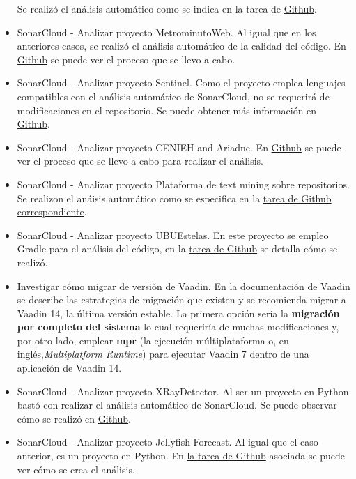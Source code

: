 \begin{itemize}
		Se realizó el análisis automático como se indica en la tarea de \href{https://github.com/dbo1001/Gestor-TFG-2021/issues/80}{Github}.
	\item SonarCloud - Analizar proyecto MetrominutoWeb. 
		Al igual que en los anteriores casos, se realizó el análisis automático de la calidad del código. En \href{https://github.com/dbo1001/Gestor-TFG-2021/issues/81}{Github} se puede ver el proceso que se llevo a cabo.
	\item SonarCloud - Analizar proyecto Sentinel. 
		Como el proyecto emplea lenguajes compatibles con el análisis automático de SonarCloud, no se requerirá de modificaciones en el repositorio. Se puede obtener más información en \href{https://github.com/dbo1001/Gestor-TFG-2021/issues/82}{Github}.
	\item SonarCloud - Analizar proyecto CENIEH and Ariadne. 
		En \href{https://github.com/dbo1001/Gestor-TFG-2021/issues/84}{Github} se puede ver el proceso que se llevo a cabo para realizar el análisis.
	\item SonarCloud - Analizar proyecto Plataforma de text mining sobre repositorios. 
		Se realizon el anáisis automático como se especifica en la \href{https://github.com/dbo1001/Gestor-TFG-2021/issues/83}{tarea de Github correspondiente}.
	\item SonarCloud - Analizar proyecto UBUEstelas. 	
		En este proyecto se empleo Gradle para el análisis del código, en la \href{https://github.com/dbo1001/Gestor-TFG-2021/issues/77}{tarea de Github} se detalla cómo se realizó.
	\item Investigar cómo migrar de versión de Vaadin.  
		En la \href{https://vaadin.com/docs/v14/guide/upgrading/v8}{documentación de Vaadin} se describe las estrategias de migración que existen y se recomienda migrar a Vaadin 14, la última versión estable. 
		La primera opción sería la \textbf{migración por completo del sistema} lo cual requeriría de muchas modificaciones y, por otro lado, emplear \textbf{mpr} (la ejecución múltiplataforma o, en inglés,\emph{Multiplatform Runtime}) para ejecutar Vaadin 7 dentro de una aplicación de Vaadin 14.
	\item SonarCloud - Analizar proyecto XRayDetector. 
		Al ser un proyecto en Python bastó con realizar el análisis automático de SonarCloud. Se puede observar cómo se realizó en \href{https://github.com/dbo1001/Gestor-TFG-2021/issues/90}{Github}.
	\item SonarCloud - Analizar proyecto Jellyfish Forecast. 
		Al igual que el caso anterior, es un proyecto en Python. En \href{https://github.com/dbo1001/Gestor-TFG-2021/issues/85}{la tarea de Github} asociada se puede ver cómo se crea el análisis.

\end{itemize}
